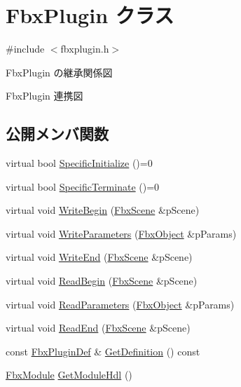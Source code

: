 \hypertarget{class_fbx_plugin}{}\section{Fbx\+Plugin クラス}
\label{class_fbx_plugin}


{\ttfamily \#include $<$fbxplugin.\+h$>$}



Fbx\+Plugin の継承関係図


Fbx\+Plugin 連携図
\subsection*{公開メンバ関数}
\begin{DoxyCompactItemize}
\item 
virtual bool \hyperlink{class_fbx_plugin_a5b6ba0af2c0cf8a7d5cb1680407d9e7e}{Specific\+Initialize} ()=0
\item 
virtual bool \hyperlink{class_fbx_plugin_ade394d2752689a4690a29b34d347446e}{Specific\+Terminate} ()=0
\item 
virtual void \hyperlink{class_fbx_plugin_aff87a8ef5c8b6bae66cc10970b7827bf}{Write\+Begin} (\hyperlink{class_fbx_scene}{Fbx\+Scene} \&p\+Scene)
\item 
virtual void \hyperlink{class_fbx_plugin_af4b6ae438302c2153d582f1d6c87b636}{Write\+Parameters} (\hyperlink{class_fbx_object}{Fbx\+Object} \&p\+Params)
\item 
virtual void \hyperlink{class_fbx_plugin_a7c61fbd0c3d3a3d41f7208c2b28ce379}{Write\+End} (\hyperlink{class_fbx_scene}{Fbx\+Scene} \&p\+Scene)
\item 
virtual void \hyperlink{class_fbx_plugin_ac39bc91afc422603d99fea3c09700814}{Read\+Begin} (\hyperlink{class_fbx_scene}{Fbx\+Scene} \&p\+Scene)
\item 
virtual void \hyperlink{class_fbx_plugin_ab64d3a67a358e3b9466bc8f6d26e3be2}{Read\+Parameters} (\hyperlink{class_fbx_object}{Fbx\+Object} \&p\+Params)
\item 
virtual void \hyperlink{class_fbx_plugin_a89290eef23c5359db142e0ad1d8743e0}{Read\+End} (\hyperlink{class_fbx_scene}{Fbx\+Scene} \&p\+Scene)
\item 
const \hyperlink{struct_fbx_plugin_def}{Fbx\+Plugin\+Def} \& \hyperlink{class_fbx_plugin_a2827e6fbb16ac3c80a2e9a50c34201c5}{Get\+Definition} () const
\item 
\hyperlink{fbxmodule_8h_a1d2ed3e9ccb8075d585f7cb7bdf40420}{Fbx\+Module} \hyperlink{class_fbx_plugin_ae50021560acfbc6a4d924cae16d5414b}{Get\+Module\+Hdl} ()

\end{DoxyCompactItemize}
